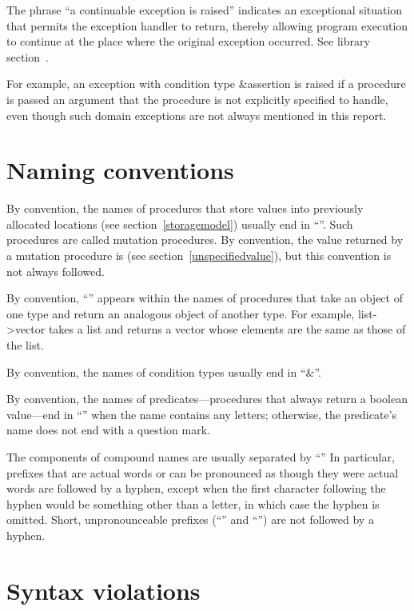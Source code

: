 The phrase ``a continuable exception is raised'' indicates
an exceptional situation that permits the exception handler to return,
thereby allowing program execution to continue at the place where the
original exception occurred.  See library section~.

For example, an exception with condition type {\cf\&assertion}
is raised if a procedure is passed an argument that the procedure
is not explicitly specified to handle, even though such domain
exceptions are not always mentioned in this report.

\section{Naming conventions}

By convention, the names of procedures that store values into previously
allocated locations (see section~\ref{storagemodel}) usually end in
``\ide{!}''.
Such procedures are called mutation procedures.
By convention, the value returned by a mutation procedure is
\unspecifiedreturn{} (see section~\ref{unspecifiedvalue}),
but this convention is not always followed.

By convention, ``\ide{->}'' appears within the names of procedures that
take an object of one type and return an analogous object of another type.
For example, {\cf list->vector} takes a list and returns a vector whose
elements are the same as those of the list.

By convention, the names of condition types usually end in
``{\cf\&}''.

By convention, the names of predicates---procedures that always return
a boolean value---end in ``'' when the name contains any
letters; otherwise, the predicate's name does not end with a question
mark.

The components of compound names are usually separated by ``\ide{-}''
In particular, prefixes that are actual words or can be pronounced as
though they were actual words are followed by a hyphen, except when
the first character following the hyphen would be something other than
a letter, in which case the hyphen is omitted.  Short,
unpronounceable prefixes (``'' and ``'') are not
followed by a hyphen.

\section{Syntax violations}

